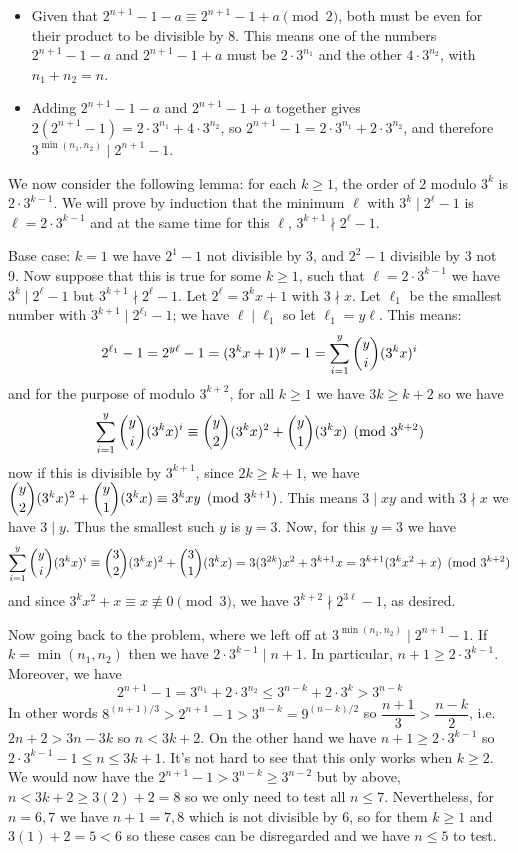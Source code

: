 \documentclass[11pt]{article}
\newcommand{\<}{\langle}
\renewcommand{\>}{\rangle}
\begin{document}
\begin{enumerate}
	\begin{itemize}
		\item Given that $2^{n+1}-1-a\equiv 2^{n+1}-1+a\pmod{2}$, both must be even for their product to be divisible by 8. This means one of the numbers $2^{n+1}-1-a$ and $2^{n+1}-1+a$ must be $2\cdot 3^{n_1}$ and the other $4\cdot 3^{n_2}$, with $n_1+n_2=n$. 
		
		\item Adding $2^{n+1}-1-a$ and $2^{n+1}-1+a$ together gives $2(2^{n+1}-1)=2\cdot 3^{n_1}+4\cdot 3^{n_2}$, so $2^{n+1}-1=2\cdot 3^{n_1}+2\cdot 3^{n_2}$, and therefore $3^{\min(n_1, n_2)}\mid 2^{n+1}-1$. 
	\end{itemize}
	
	We now consider the following lemma: for each $k\ge 1$, the order of $2$ modulo $3^k$ is $2\cdot 3^{k-1}$. We will prove by induction that the minimum $\ell$ with $3^k\mid 2^{\ell}-1$ is $\ell=2\cdot 3^{k-1}$ and at the same time for this $\ell$, $3^{k+1}\nmid 2^{\ell}-1$. 
	
	Base case: $k=1$ we have $2^1-1$ not divisible by 3, and $2^2-1$ divisible by 3 not 9. Now suppose that this is true for some $k\ge 1$, such that $\ell=2\cdot 3^{k-1}$ we have $3^k\mid 2^{\ell}-1$ but $3^{k+1}\nmid 2^{\ell}-1$. Let $2^{\ell}=3^kx+1$ with $3\nmid x$. Let $\ell_1$ be the smallest number with $3^{k+1}\mid 2^{\ell_1}-1$; we have $\ell\mid \ell_1$ so let $\ell_1=y\ell$. This means: 
	\[
	2^{\ell_1}-1 = 2^{y\ell}-1=(3^kx+1)^y-1 = \displaystyle\sum_{i=1}^y \dbinom{y}{i}(3^kx)^i
	\]
	and for the purpose of modulo $3^{k+2}$, for all $k\ge 1$ we have $3k\ge k+2$ so we have 
	\[
	\displaystyle\sum_{i=1}^y \dbinom{y}{i}(3^kx)^i\equiv 
	\dbinom{y}{2}(3^kx)^2 + \dbinom{y}{1}(3^kx)
	\pmod{3^{k+2}}
	\]
	now if this is divisible by $3^{k+1}$, since $2k\ge k+1$, we have $\dbinom{y}{2}(3^kx)^2 + \dbinom{y}{1}(3^kx)\equiv 3^kxy\pmod{3^{k+1}}$. This means $3\mid xy$ and with $3\nmid x$ we have $3\mid y$. Thus the smallest such $y$ is $y=3$. Now, for this $y=3$ we have 
	\[
	\displaystyle\sum_{i=1}^y \dbinom{y}{i}(3^kx)^i\equiv 
	\dbinom{3}{2}(3^kx)^2 + \dbinom{3}{1}(3^kx)
	=3(3^{2k})x^2+3^{k+1}x
	=3^{k+1}(3^kx^2+x)
	\pmod{3^{k+2}}
	\]
	and since $3^kx^2+x\equiv x\not\equiv 0\pmod{3}$, we have $3^{k+2}\nmid 2^{3\ell}-1$, as desired. 
	
	Now going back to the problem, where we left off at $3^{\min(n_1, n_2)}\mid 2^{n+1}-1$. If $k=\min(n_1, n_2)$ then we have $2\cdot 3^{k-1}\mid n+1$. In particular, $n+1\ge 2\cdot 3^{k-1}$.  Moreover, we have 
	\[2^{n+1}-1= 3^{n_1}+2\cdot 3^{n_2}\le 3^{n-k}+2\cdot 3^k > 3^{n-k}
	\]
	In other words $8^{(n+1)/3}>2^{n+1}-1 > 3^{n-k}=9^{(n-k)/2}$ so $\dfrac{n+1}{3}> \dfrac{n-k}{2}$, i.e. $2n+2> 3n-3k$ so $n<3k+2$. On the other hand we have $n+1\ge 2\cdot 3^{k-1}$ so $2\cdot 3^{k-1} -1 \le n\le 3k+1$. It's not hard to see that this only works when $k\ge 2$. We would now have the $2^{n+1}-1>3^{n-k}\ge 3^{n-2}$ but by above, $n<3k+2\ge 3(2)+2=8$ so we only need to test all $n\le 7$. Nevertheless, for $n=6, 7$ we have $n+1=7, 8$ which is not divisible by 6, so for them $k\ge 1$ and $3(1)+2=5<6$ so these cases can be disregarded and we have $n\le 5$ to test. 
	

\end{enumerate}
\end{document}
